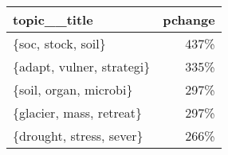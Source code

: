 \begin{tabular}{p{1.2cm}r}
\toprule
              topic\_\_title &  pchange \\
\midrule
        \{soc, stock, soil\} &     437\% \\
 \{adapt, vulner, strategi\} &     335\% \\
    \{soil, organ, microbi\} &     297\% \\
  \{glacier, mass, retreat\} &     297\% \\
  \{drought, stress, sever\} &     266\% \\
\bottomrule
\end{tabular}
